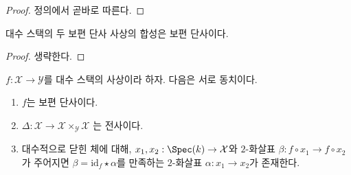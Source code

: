 \begin{proof}
정의에서 곧바로 따른다.
\end{proof}

\begin{lemma}
\label{lemma-composition-universally-injective}
대수 스택의 두 보편 단사 사상의 합성은 보편 단사이다.
\end{lemma}

\begin{proof}
생략한다.
\end{proof}

\begin{lemma}
\label{lemma-universally-injective}
$f : \mathcal{X} \to \mathcal{Y}$를 대수 스택의 사상이라 하자.
다음은 서로 동치이다.
\begin{enumerate}
\item $f$는 보편 단사이다.
\item $\Delta : \mathcal{X} \to \mathcal{X} \times_\mathcal{Y} \mathcal{X}$
는 전사이다.
\item 대수적으로 닫힌 체에 대해,
$x_1, x_2 : \Spec(k) \to \mathcal{X}$와 $2$-화살표
$\beta : f \circ x_1 \to f \circ x_2$가 주어지면
$\beta = \text{id}_f \star \alpha$를 만족하는 $2$-화살표
$\alpha : x_1 \to x_2$가 존재한다.
\end{enumerate}
\end{lemma}

